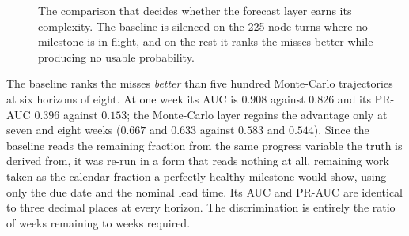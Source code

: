 \begin{figure}[htbp]
\centering
{}
\caption[A one-line baseline against the simulation]{The comparison that decides whether the
forecast layer earns its complexity. The baseline is silenced on the 225 node-turns where no
milestone is in flight, and on the rest it ranks the misses better while producing no usable
probability.}
\label{fig:baseline}
\end{figure}

The baseline ranks the misses \emph{better} than five hundred Monte-Carlo trajectories at six
horizons of eight. At one week its AUC is $0.908$ against $0.826$ and its PR-AUC $0.396$
against $0.153$; the Monte-Carlo layer regains the advantage only at seven and eight weeks
($0.667$ and $0.633$ against $0.583$ and $0.544$). Since the baseline reads the remaining
fraction from the same progress variable the truth is derived from, it was re-run in a form
that reads nothing at all, remaining work taken as the calendar fraction a perfectly healthy
milestone would show, using only the due date and the nominal lead time. Its AUC and PR-AUC are
identical to three decimal places at every horizon. The discrimination is entirely the ratio of
weeks remaining to weeks required.

